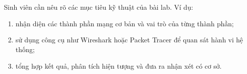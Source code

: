 \section{\sectionobjectivestitle}
Sinh viên cần nêu rõ các mục tiêu kỹ thuật của bài lab. Ví dụ:
\begin{enumerate}[leftmargin=2em]
    \item nhận diện các thành phần mạng cơ bản và vai trò của từng thành phần;
    \item sử dụng công cụ như Wireshark hoặc Packet Tracer để quan sát hành vi hệ thống;
    \item tổng hợp kết quả, phân tích hiện tượng và đưa ra nhận xét có cơ sở.
\end{enumerate}
